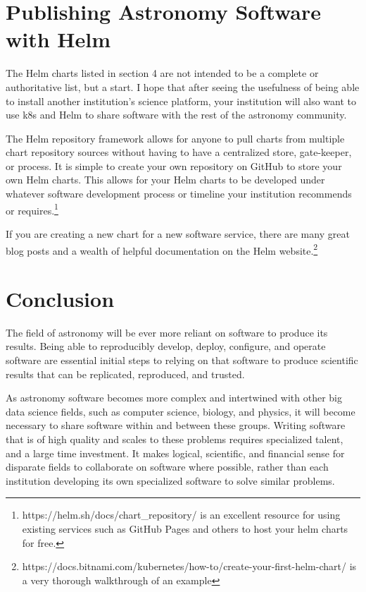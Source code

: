 \documentclass[11pt,twoside]{article}
\begin{document}
\section{Publishing Astronomy Software with Helm}

The Helm charts listed in section 4 are not intended to be a complete or authoritative
list, but a start.  I hope that after seeing the usefulness of being able
to install another institution's science platform, your institution will also want to
use k8s and Helm to share software with the rest of the astronomy community.

The Helm repository framework allows for anyone to pull charts from multiple chart
repository sources without having to have a centralized store, gate-keeper, or process.  It is
simple to create your own repository on GitHub to store your own Helm charts.
This allows for your Helm charts to be developed under whatever software development
process or timeline your institution recommends or requires.\footnote{
https://helm.sh/docs/chart\_repository/ is an excellent resource for using existing
services such as GitHub Pages and others to host your helm charts for free.}

If you are creating a new chart for a new software service, there are many great
blog posts and a wealth of helpful documentation on the Helm website.\footnote{
https://docs.bitnami.com/kubernetes/how-to/create-your-first-helm-chart/
is a very thorough walkthrough of an example}

\section{Conclusion}

The field of astronomy will be ever more reliant on software to produce its results.
Being able to reproducibly develop, deploy, configure, and operate software are
essential initial steps to relying on that software to produce scientific
results that can be replicated, reproduced, and trusted.

As astronomy software becomes more complex and intertwined with other big
data science fields, such as computer science, biology, and physics, it will
become necessary to share software within and between these groups.  Writing software that
is of high quality and scales to these problems requires specialized talent,
and a large time investment.  It makes logical, scientific, and financial
sense for disparate fields to collaborate on software where possible,
rather than each institution developing its own specialized software
to solve similar problems.
\end{document}
